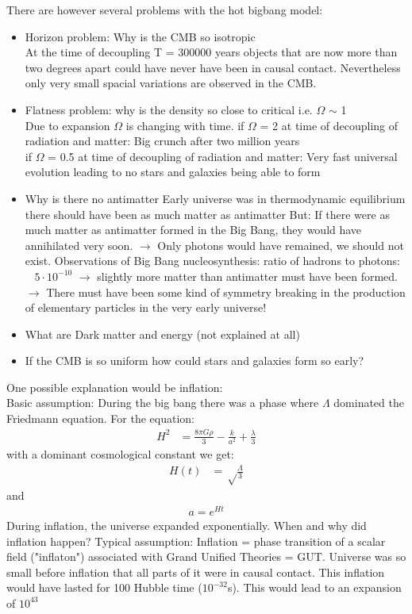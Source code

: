 \documentclass[11pt,a4paper]{article}
\begin{document}
There are however several problems with the hot bigbang model:
\begin{itemize}
    \item Horizon problem: Why is the CMB so isotropic \\ 
        At the time of decoupling T = 300000 years objects that are now more than two degrees apart could have never have been in causal contact. 
    Nevertheless only very small spacial variations are observed in the CMB.
    \item Flatness problem: why is the density so close to critical i.e. $\Omega$ $\sim$ 1\\ 
        Due to expansion $\Omega$ is changing with time. 
        if $\Omega$ = 2 at time of decoupling of radiation and matter:
        Big crunch after two million years\\ 
        if $\Omega$ = 0.5 at time of decoupling of radiation and matter:
        Very fast universal evolution leading to no stars and galaxies being able to form
    \item Why is there no antimatter 
        Early universe was in thermodynamic equilibrium
 there should have been as much matter as antimatter
But: If there were as much matter as antimatter formed in the Big Bang, they
would have annihilated very soon.
$\rightarrow$ Only photons would have remained, we should not exist.
Observations of Big Bang nucleosynthesis: ratio of hadrons to photons: ~ $5 \cdot 10^{-10}$
$\rightarrow$ slightly more matter than antimatter must have been formed.
$\rightarrow$ There must have been some kind of symmetry breaking in the production of
elementary particles in the very early universe!
    \item What are Dark matter and energy (not explained at all)
    \item If the CMB is so uniform how could stars and galaxies form so early?
\end{itemize}

One possible explanation would be inflation: \\
Basic assumption:
During the big bang there was a phase where $\Lambda$ dominated the Friedmann equation.
For the equation:
\begin{align*}
    H^2 &= \frac {8 \pi G \rho}{3} - \frac k {a^2} + \frac \lambda 3  
\end{align*}
with a dominant cosmological constant we get: 
\begin{align*}
    H(t) &= \sqrt \frac \Lambda 3 
\end{align*}
and 
\begin{align*}
    a = e^{Ht} 
\end{align*}
During inflation, the universe expanded exponentially.
When and why did inflation happen?
Typical assumption: Inflation = phase transition of a scalar field ("inflaton") associated with Grand Unified Theories = GUT.
Universe was so small before inflation that all parts of it were in causal contact.
This inflation would have lasted for 100 Hubble time ($10^{-32}$s). 
This would lead to an expansion of $10^{43}$
\end{document}
